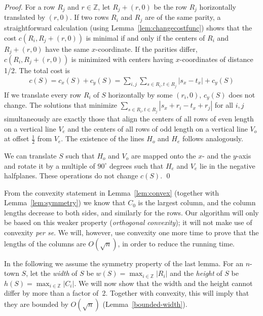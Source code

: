 \documentclass[preprint,authoryear,12pt]{elsarticle}
\begin{document}
\begin{proof}
For a row $R_j$ and $r\in \mathbb{Z}$, let $R_j+(r,0)$ be
the row $R_j$ horizontally translated by $(r,0)$. If two rows $R_i$ and $R_j$
are of the same parity, a straightforward calculation
(using Lemma~\ref{lem:changecostfunc}) shows that
the cost $c(R_i,R_j+(r,0))$ is minimal if
and only if the centers of $R_i$ and $R_j+(r,0)$ have the same $x$-coordinate. If the parities differ, $c(R_i,R_j+(r,0))$ is
minimized with centers having $x$-coordinates of distance 1/2.
The total cost is
\begin{eqnarray*}
c(S) = c_x(S) + c_y(S)  =
 \sum_{i,j} \sum_{s \in R_i, t \in R_j} |s_x -t_x| + c_y(S)
\end{eqnarray*}
If we translate every row $R_i$ of $S$ horizontally by some
$(r_i,0)$, $c_y(S)$ does not change. The solutions that minimize
$\sum_{s \in R_i, t \in R_j} |s_x + r_i -t_x + r_j|$ for all $i,j$
simultaneously are exactly those that align the centers of all rows
of even length on a vertical line $V_e$ and the centers of all rows
of odd length on a vertical line $V_o$ at offset $\frac12$ from
$V_e$. The existence of the lines $H_o$ and $H_e$ follows
analogously.


We can translate $S$ such that $H_o$ and $V_o$ are mapped onto the
$x$- and the $y$-axis and rotate it by a multiple of $90^\circ$
degrees such that $H_e$ and $V_e$ lie in the negative halfplanes.
These operations do not change $c(S)$. \qed
\end{proof}


{From} the convexity statement in Lemma~\ref{lem:convex} (together
with Lemma~\ref{lem:symmetry}) we know that $C_0$ is the largest
column, and the column lengths decrease to both sides, and similarly
for the rows.
Our algorithm will only be based on this weaker property
(\emph{orthogonal convexity}); it will not make use of convexity
\emph{per se}.
We will, however, use convexity one more time to prove that the
lengths of the columns are $O(\sqrt n)$, in order to reduce the
running time.




In the following we assume the symmetry property of the last lemma.
For an $n$-town $S$, let the \emph{width} of $S$ be
$w(S)=\max_{i \in \mathbb{Z}} |R_i|$ and the \emph{height} of $S$ be
$h(S)=\max_{i \in \mathbb{Z}} |C_i|$. We will now show that the width
and the height cannot differ by more than a factor of~2.
Together with convexity, this will imply that they are bounded by
$O(\sqrt n)$ (Lemma~\ref{bounded-width}).
\end{document}
